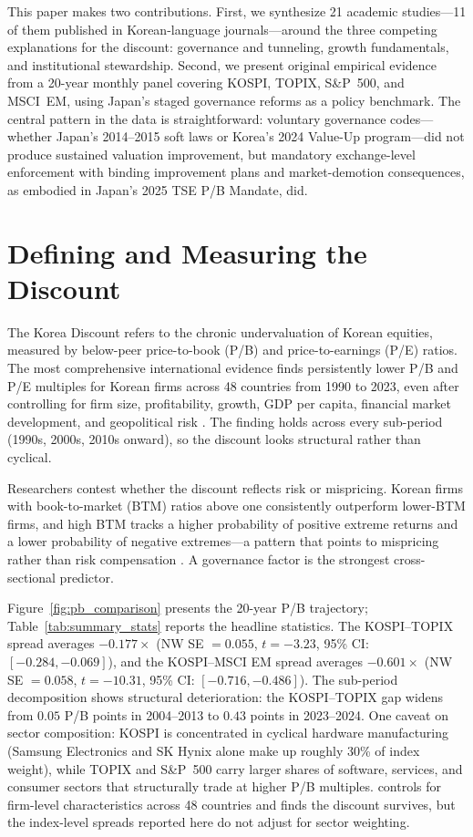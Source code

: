 \documentclass[12pt]{article}
\begin{document}
This paper makes two contributions. First, we synthesize 21 academic studies---11 of them published in Korean-language journals---around the three competing explanations for the discount: governance and tunneling, growth fundamentals, and institutional stewardship. Second, we present original empirical evidence from a 20-year monthly panel covering KOSPI, TOPIX, S\&P~500, and MSCI~EM, using Japan's staged governance reforms as a policy benchmark. The central pattern in the data is straightforward: voluntary governance codes---whether Japan's 2014--2015 soft laws or Korea's 2024 Value-Up program---did not produce sustained valuation improvement, but mandatory exchange-level enforcement with binding improvement plans and market-demotion consequences, as embodied in Japan's 2025 TSE P/B Mandate, did.

\section{Defining and Measuring the Discount}
\label{sec:measurement}

The Korea Discount refers to the chronic undervaluation of Korean equities, measured by below-peer price-to-book (P/B) and price-to-earnings (P/E) ratios. The most comprehensive international evidence finds persistently lower P/B and P/E multiples for Korean firms across 48 countries from 1990 to 2023, even after controlling for firm size, profitability, growth, GDP per capita, financial market development, and geopolitical risk \citep{kim2026korean}. The finding holds across every sub-period (1990s, 2000s, 2010s onward), so the discount looks structural rather than cyclical.

Researchers contest whether the discount reflects risk or mispricing. Korean firms with book-to-market (BTM) ratios above one consistently outperform lower-BTM firms, and high BTM tracks a higher probability of positive extreme returns and a lower probability of negative extremes---a pattern that points to mispricing rather than risk compensation \citep{jung2022korea}. A governance factor is the strongest cross-sectional predictor.

Figure~\ref{fig:pb_comparison} presents the 20-year P/B trajectory; Table~\ref{tab:summary_stats} reports the headline statistics. The KOSPI--TOPIX spread averages $-0.177\times$ (NW SE $= 0.055$, $t=-3.23$, 95\% CI: $[-0.284, -0.069]$), and the KOSPI--MSCI EM spread averages $-0.601\times$ (NW SE $= 0.058$, $t=-10.31$, 95\% CI: $[-0.716, -0.486]$). The sub-period decomposition shows structural deterioration: the KOSPI--TOPIX gap widens from $0.05$ P/B points in 2004--2013 to $0.43$ points in 2023--2024. One caveat on sector composition: KOSPI is concentrated in cyclical hardware manufacturing (Samsung Electronics and SK Hynix alone make up roughly 30\% of index weight), while TOPIX and S\&P~500 carry larger shares of software, services, and consumer sectors that structurally trade at higher P/B multiples. \citet{kim2026korean} controls for firm-level characteristics across 48 countries and finds the discount survives, but the index-level spreads reported here do not adjust for sector weighting.
\end{document}
